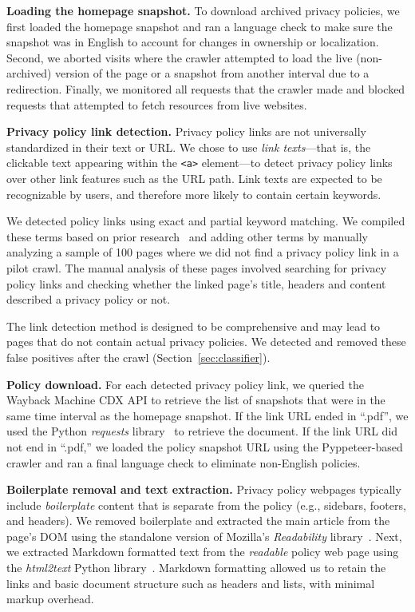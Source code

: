 {\textbf{Loading the homepage snapshot.}}
To download archived privacy policies, we first loaded the homepage snapshot and ran a language check to make sure the snapshot was in English to account for changes in ownership or localization.
Second, we aborted visits where the crawler attempted to load the live (non-archived) version of the page or a snapshot from another interval due to a redirection.
Finally, we monitored all requests that the crawler made and blocked requests that attempted to fetch resources from live websites.

{\textbf{Privacy policy link detection.}}
Privacy policy links are not universally standardized in their text or URL.
We chose to use \textit{link texts}---that is, the clickable text appearing within the \texttt{<a>} element---to detect privacy policy links over other link features such as the URL path. Link texts are expected to be recognizable by users, and therefore more likely to contain certain keywords.

We detected policy links using exact and partial keyword matching.
We compiled these terms based on prior research~\cite{libert2018automated} and adding other terms by manually analyzing a sample of 100 pages where we did not find a privacy policy link in a pilot crawl. 
The manual analysis of these pages involved searching for privacy policy links and checking whether the linked page’s title, headers and content described a privacy policy or not. 

The link detection method is designed to be comprehensive and may lead to pages that do not contain actual privacy policies.
We detected and removed these false positives after the crawl (Section~\ref{sec:classifier}).

{\textbf{Policy download.}}
For each detected privacy policy link, we queried the Wayback Machine CDX API to retrieve the list of snapshots that were in the same time interval as the homepage snapshot. 
If the link URL ended in ``.pdf'', we used the Python \textit{requests} library~\cite{PyPI-requests} to retrieve the document.
If the link URL did not end in ``.pdf,'' we loaded the policy snapshot URL using the Pyppeteer-based crawler and ran a final language check to eliminate non-English policies.

{\textbf{Boilerplate removal and text extraction.}}
Privacy policy webpages typically include \emph{boilerplate} content that is separate from the policy (e.g., sidebars, footers, and headers). 
We removed boilerplate and extracted the main article from the page's DOM using the standalone version of Mozilla’s \emph{Readability} library~\cite{readability-mozilla}. 
Next, we extracted Markdown formatted text from the \emph{readable} policy web page using the \emph{html2text} Python library~\cite{html2text-github}. Markdown formatting allowed us to retain the links and basic document structure such as headers and lists, with minimal markup overhead.

